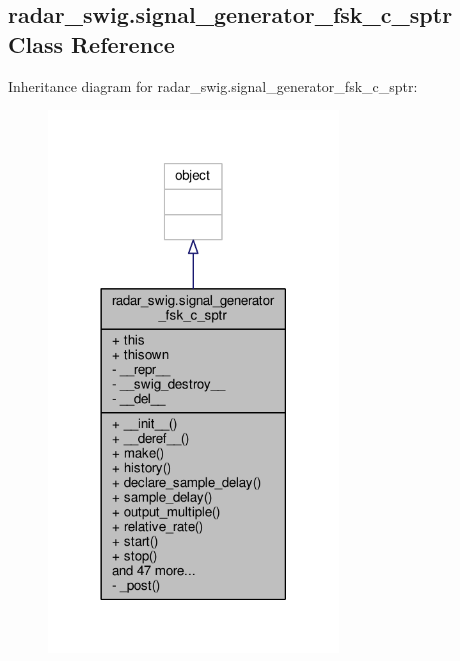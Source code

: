 \subsection{radar\+\_\+swig.\+signal\+\_\+generator\+\_\+fsk\+\_\+c\+\_\+sptr Class Reference}
\label{classradar__swig_1_1signal__generator__fsk__c__sptr}


Inheritance diagram for radar\+\_\+swig.\+signal\+\_\+generator\+\_\+fsk\+\_\+c\+\_\+sptr\+:
\nopagebreak
\begin{figure}[H]
\begin{center}
\leavevmode
\includegraphics[width=218pt]{d2/d9e/classradar__swig_1_1signal__generator__fsk__c__sptr__inherit__graph}
\end{center}
\end{figure}


